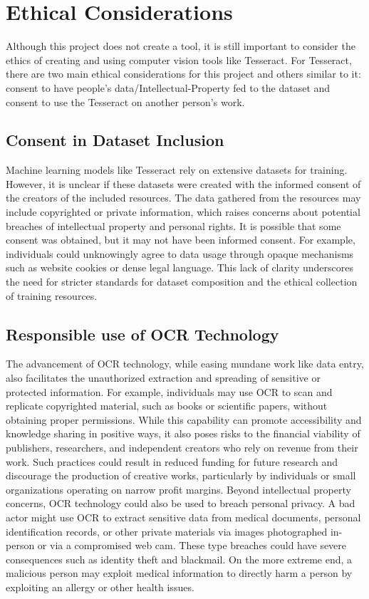 \documentclass[10pt,twocolumn]{article}
\begin{document}
\section{Ethical Considerations}
Although this project does not create a tool, it is still important to consider the ethics of creating and using computer vision tools like Tesseract. For Tesseract, there are two main ethical considerations for this project and others similar to it: consent to have people’s data/Intellectual-Property fed to the dataset and consent to use the Tesseract on another person’s work. 
\subsection{Consent in Dataset Inclusion}
Machine learning models like Tesseract rely on extensive datasets for training. However, it is unclear if these datasets were created with the informed consent of the creators of the included resources. The data gathered from the resources may include copyrighted or private information, which raises concerns about potential breaches of intellectual property and personal rights. It is possible that some consent was obtained, but it may not have been informed consent. For example, individuals could unknowingly agree to data usage through opaque mechanisms such as website cookies or dense legal language. This lack of clarity underscores the need for stricter standards for dataset composition and the ethical collection of training resources.
\subsection{Responsible use of OCR Technology}
The advancement of OCR technology, while easing mundane work like data entry, also facilitates the unauthorized extraction and spreading of sensitive or protected information. For example, individuals may use OCR to scan and replicate copyrighted material, such as books or scientific papers, without obtaining proper permissions. While this capability can promote accessibility and knowledge sharing in positive ways, it also poses risks to the financial viability of publishers, researchers, and independent creators who rely on revenue from their work. Such practices could result in reduced funding for future research and discourage the production of creative works, particularly by individuals or small organizations operating on narrow profit margins. Beyond intellectual property concerns, OCR technology could also be used to breach  personal privacy. A bad actor might use OCR to extract sensitive data from medical documents, personal identification records, or other private materials via images photographed in-person or via a compromised web cam.  These type breaches could have severe consequences such as identity theft and blackmail. On the more extreme end, a malicious person may exploit medical information to directly harm a person by exploiting an allergy or other health issues.
\end{document}

